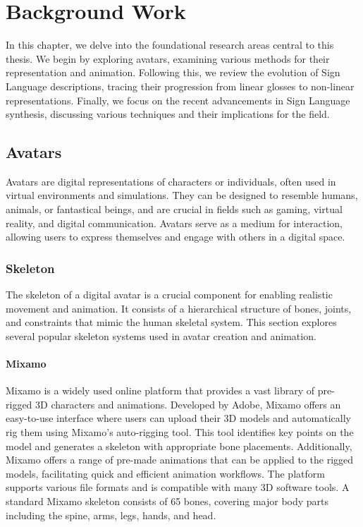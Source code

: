 \chapter{Background Work}

In this chapter, we delve into the foundational research areas central to this thesis. We begin by exploring avatars, examining various methods for their representation and animation. Following this, we review the evolution of Sign Language descriptions, tracing their progression from linear glosses to non-linear representations. Finally, we focus on the recent advancements in Sign Language synthesis, discussing various techniques and their implications for the field.

\section{Avatars}

Avatars are digital representations of characters or individuals, often used in virtual environments and simulations. They can be designed to resemble humans, animals, or fantastical beings, and are crucial in fields such as gaming, virtual reality, and digital communication. Avatars serve as a medium for interaction, allowing users to express themselves and engage with others in a digital space. 

\subsection{Skeleton}

The skeleton of a digital avatar is a crucial component for enabling realistic movement and animation. It consists of a hierarchical structure of bones, joints, and constraints that mimic the human skeletal system. This section explores several popular skeleton systems used in avatar creation and animation.

\subsubsection{Mixamo}

Mixamo is a widely used online platform that provides a vast library of pre-rigged 3D characters and animations. Developed by Adobe, Mixamo offers an easy-to-use interface where users can upload their 3D models and automatically rig them using Mixamo's auto-rigging tool. This tool identifies key points on the model and generates a skeleton with appropriate bone placements. Additionally, Mixamo offers a range of pre-made animations that can be applied to the rigged models, facilitating quick and efficient animation workflows. The platform supports various file formats and is compatible with many 3D software tools. A standard Mixamo skeleton consists of 65 bones, covering major body parts including the spine, arms, legs, hands, and head.

